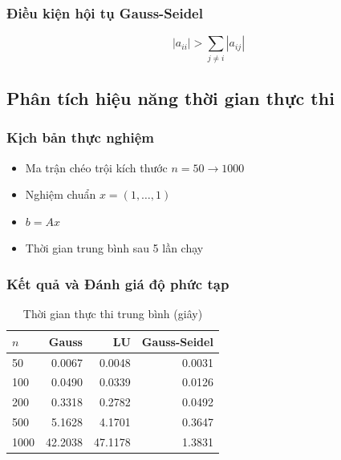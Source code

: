 \documentclass[a4paper]{article}
\begin{document}
\subsubsection{Điều kiện hội tụ Gauss-Seidel}
\begin{equation}
    |a_{ii}| > \sum_{j \ne i} |a_{ij}|
\end{equation}

\subsection{Phân tích hiệu năng thời gian thực thi}

\subsubsection{Kịch bản thực nghiệm}
\begin{itemize}
    \item Ma trận chéo trội kích thước $n = 50 \rightarrow 1000$
    \item Nghiệm chuẩn $x = (1, \dots, 1)$
    \item $b = Ax$
    \item Thời gian trung bình sau 5 lần chạy
\end{itemize}

\subsubsection{Kết quả và Đánh giá độ phức tạp}

\begin{table}[h!]
\centering
\caption{Thời gian thực thi trung bình (giây)}
\begin{tabular}{lrrr}
\toprule
\textbf{$n$} & \textbf{Gauss} & \textbf{LU} & \textbf{Gauss-Seidel} \\
\midrule
50   & 0.0067 & 0.0048 & 0.0031 \\
100  & 0.0490 & 0.0339 & 0.0126 \\
200  & 0.3318 & 0.2782 & 0.0492 \\
500  & 5.1628 & 4.1701 & 0.3647 \\
1000 & 42.2038 & 47.1178 & 1.3831 \\
\bottomrule
\end{tabular}
\end{table}
\end{document}
